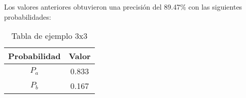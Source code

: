 Los valores anteriores obtuvieron una precisión del 89.47\% con las siguientes probabilidades:

\begin{table}[H]
    \centering
    \caption{Tabla de ejemplo 3x3}
    \begin{tabular}{|c|c|}
    \hline
    Probabilidad & Valor  \\ \hline
    $P_{a}$    & 0.833    \\ \hline
    $P_{b}$    & 0.167     \\ \hline
    \end{tabular}
\end{table}

